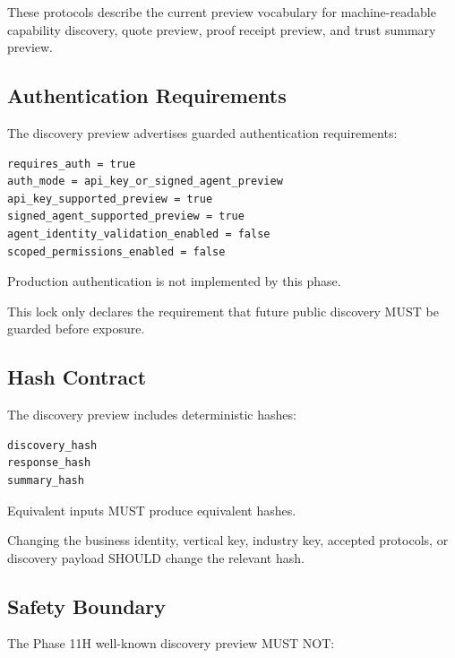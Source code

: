 These protocols describe the current preview vocabulary for machine-readable capability discovery, quote preview, proof receipt preview, and trust summary preview.

\subsection{Authentication Requirements}

The discovery preview advertises guarded authentication requirements:

\begin{verbatim}
requires_auth = true
auth_mode = api_key_or_signed_agent_preview
api_key_supported_preview = true
signed_agent_supported_preview = true
agent_identity_validation_enabled = false
scoped_permissions_enabled = false
\end{verbatim}

Production authentication is not implemented by this phase.

This lock only declares the requirement that future public discovery MUST be guarded before exposure.

\subsection{Hash Contract}

The discovery preview includes deterministic hashes:

\begin{verbatim}
discovery_hash
response_hash
summary_hash
\end{verbatim}

Equivalent inputs MUST produce equivalent hashes.

Changing the business identity, vertical key, industry key, accepted protocols, or discovery payload SHOULD change the relevant hash.

\subsection{Safety Boundary}

The Phase 11H well-known discovery preview MUST NOT:

